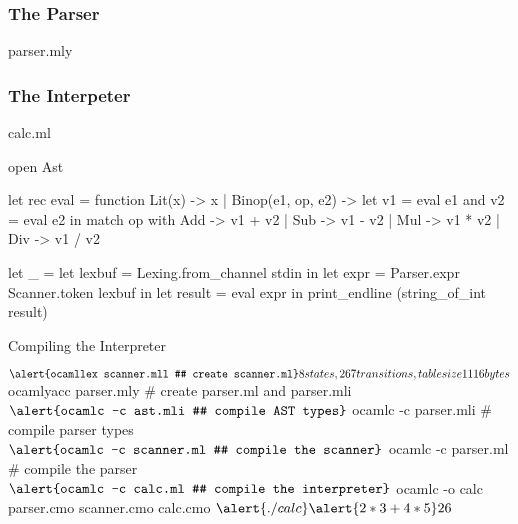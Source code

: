 \documentclass{plt}
\begin{document}
\begin{frame}[fragile]
  \frametitle{The Parser}

parser.mly

\vspace{4pt}

\end{frame}

\begin{frame}[fragile]
  \frametitle{The Interpeter}

calc.ml

\vspace{4pt}

\begin{ocaml}
open Ast

let rec eval = function 
    Lit(x) -> x
  | Binop(e1, op, e2) ->
      let v1 = eval e1 and v2 = eval e2 in
      match op with
        Add -> v1 + v2
      | Sub -> v1 - v2
      | Mul -> v1 * v2
      | Div -> v1 / v2

let _ =
  let lexbuf = Lexing.from_channel stdin in
  let expr = Parser.expr Scanner.token lexbuf in
  let result = eval expr in
  print_endline (string_of_int result)
\end{ocaml}

\end{frame}

\begin{frame}[fragile]{Compiling the Interpreter}

\begin{semiverbatim}
$ \alert{ocamllex scanner.mll # create scanner.ml}
8 states, 267 transitions, table size 1116 bytes
$ \alert{ocamlyacc parser.mly # create parser.ml and parser.mli}
$ \alert{ocamlc -c ast.mli    # compile AST types}
$ \alert{ocamlc -c parser.mli # compile parser types}
$ \alert{ocamlc -c scanner.ml # compile the scanner}
$ \alert{ocamlc -c parser.ml  # compile the parser}
$ \alert{ocamlc -c calc.ml    # compile the interpreter}
$ \alert{ocamlc -o calc parser.cmo scanner.cmo calc.cmo}
$ \alert{./calc}
\alert{2 * 3 + 4 * 5}
26
$
\end{semiverbatim}

\end{frame}
\end{document}
